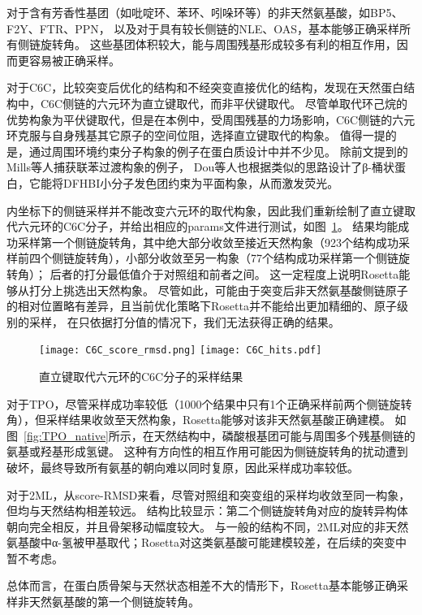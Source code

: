 对于含有芳香性基团（如吡啶环、苯环、吲哚环等）的非天然氨基酸，如BP5、F2Y、FTR、PPN，
以及对于具有较长侧链的NLE、OAS，基本能够正确采样所有侧链旋转角。
这些基团体积较大，能与周围残基形成较多有利的相互作用，因而更容易被正确采样。

对于C6C，比较突变后优化的结构和不经突变直接优化的结构，发现在天然蛋白结构中，C6C侧链的六元环为直立键取代，而非平伏键取代。
尽管单取代环己烷的优势构象为平伏键取代，但是在本例中，受周围残基的力场影响，C6C侧链的六元环克服与自身残基其它原子的空间位阻，选择直立键取代的构象。
值得一提的是，通过周围环境约束分子构象的例子在蛋白质设计中并不少见。
除前文提到的Mills等人捕获联苯过渡构象的例子，
Dou等人\cite{RN106}也根据类似的思路设计了β-桶状蛋白，它能将DFHBI小分子发色团约束为平面构象，从而激发荧光。

内坐标下的侧链采样并不能改变六元环的取代构象，因此我们重新绘制了直立键取代六元环的C6C分子，并给出相应的params文件进行测试，如图~\ref{fig:C6C}。
结果均能成功采样第一个侧链旋转角，其中绝大部分收敛至接近天然构象（923个结构成功采样前四个侧链旋转角），小部分收敛至另一构象（77个结构成功采样第一个侧链旋转角）；
后者的打分最低值介于对照组和前者之间。
这一定程度上说明Rosetta能够从打分上挑选出天然构象。
尽管如此，可能由于突变后非天然氨基酸侧链原子的相对位置略有差异，且当前优化策略下Rosetta并不能给出更加精细的、原子级别的采样，
在只依据打分值的情况下，我们无法获得正确的结果。
\begin{figure}
  \centering
    {\texttt{[image: C6C\_score\_rmsd.png]}}
    {\texttt{[image: C6C\_hits.pdf]}}
  \caption{直立键取代六元环的C6C分子的采样结果}
  \label{fig:C6C}
\end{figure}


对于TPO，尽管采样成功率较低（1000个结果中只有1个正确采样前两个侧链旋转角），但采样结果收敛至天然构象，Rosetta能够对该非天然氨基酸正确建模。
如图~\ref{fig:TPO_native}所示，在天然结构中，磷酸根基团可能与周围多个残基侧链的氨基或羟基形成氢键。
这种有方向性的相互作用可能因为侧链旋转角的扰动遭到破坏，最终导致所有氨基的朝向难以同时复原，因此采样成功率较低。

对于2ML，从score-RMSD来看，尽管对照组和突变组的采样均收敛至同一构象，但均与天然结构相差较远。
结构比较显示：第二个侧链旋转角对应的旋转异构体朝向完全相反，并且骨架移动幅度较大。
与一般的结构不同，2ML对应的非天然氨基酸中α-氢被甲基取代；Rosetta对这类氨基酸可能建模较差，在后续的突变中暂不考虑。

总体而言，在蛋白质骨架与天然状态相差不大的情形下，Rosetta基本能够正确采样非天然氨基酸的第一个侧链旋转角。
